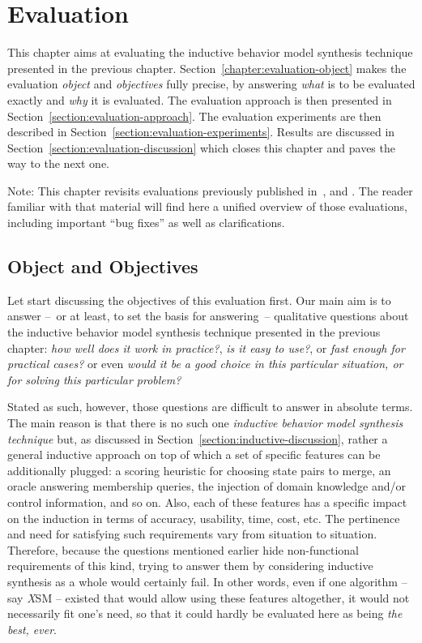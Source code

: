 \chapter{Evaluation\label{chapter:evaluation}}

This chapter aims at evaluating the inductive behavior model synthesis technique presented in the previous chapter. Section~\ref{chapter:evaluation-object} makes the evaluation \emph{object} and \emph{objectives} fully precise, by answering \emph{what} is to be evaluated exactly and \emph{why} it is evaluated. The evaluation approach is then presented in Section~\ref{section:evaluation-approach}. The evaluation experiments are then described in Section~\ref{section:evaluation-experiments}. Results are discussed in Section~\ref{section:evaluation-discussion} which closes this chapter and paves the way to the next one.

Note: This chapter revisits evaluations previously published in~\cite{Damas:2006}, \cite{Dupont:2008} and \cite{Lambeau:2008}. The reader familiar with that material will find here a unified overview of those evaluations, including important ``bug fixes'' as well as clarifications.

\section{Object and Objectives\label{chapter:evaluation-object}}

Let start discussing the objectives of this evaluation first. Our main aim is to answer --~or at least, to set the basis for answering~-- qualitative questions about the inductive behavior model synthesis technique presented in the previous chapter: \emph{how well does it work in practice?}, \emph{is it easy to use?}, or \emph{fast enough for practical cases?} or even \emph{would it be a good choice in this particular situation, or for solving this particular problem?}

Stated as such, however, those questions are difficult to answer in absolute terms. The main reason is that there is no such one \emph{inductive behavior model synthesis technique} but, as discussed in Section~\ref{section:inductive-discussion}, rather a general inductive approach on top of which a set of specific features can be additionally plugged: a scoring heuristic for choosing state pairs to merge, an oracle answering membership queries, the injection of domain knowledge and/or control information, and so on. Also, each of these features has a specific impact on the induction in terms of accuracy, usability, time, cost, etc. The pertinence and need for satisfying such requirements vary from situation to situation. Therefore, because the questions mentioned earlier hide non-functional requirements of this kind, trying to answer them by considering inductive synthesis as a whole would certainly fail. In other words, even if one algorithm -- say \emph{X}SM -- existed that would allow using these features altogether, it would not necessarily fit one's need, so that it could hardly be evaluated here as being \emph{the best, ever}.

